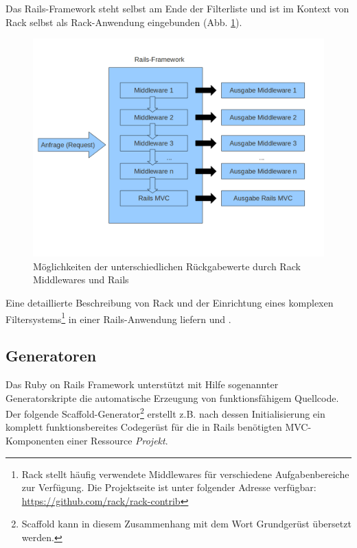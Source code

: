 %
Das Rails-Framework steht selbst am Ende der Filterliste und ist im Kontext von Rack selbst als Rack-Anwendung eingebunden (Abb. \ref{rackmiddlewares}).
\begin{figure}[!ht]
\begin{center}
\includegraphics[scale=0.5]{images/rack/middlewares.png}
\caption{Möglichkeiten der unterschiedlichen Rückgabewerte durch Rack Middlewares und Rails}
\label{rackmiddlewares}
\end{center}
\end{figure}
Eine detaillierte Beschreibung von Rack und der Einrichtung eines komplexen Filtersystems\footnote{Rack stellt häufig verwendete Middlewares für verschiedene Aufgabenbereiche zur Verfügung. Die Projektseite ist unter folgender Adresse verfügbar: \href{https://github.com/rack/rack-contrib}{https://github.com/rack/rack-contrib}} in einer Rails-Anwendung liefern \cite{rack} und \cite{railsguiderack}.

\subsection{Generatoren}
\label{sec:railsgeneratoren}
Das Ruby on Rails Framework unterstützt mit Hilfe sogenannter Generatorskripte die automatische Erzeugung von funktionsfähigem Quellcode. Der folgende Scaffold-Generator\footnote{Scaffold kann in diesem Zusammenhang mit dem Wort Grundgerüst übersetzt werden.} erstellt z.B. nach dessen Initialisierung ein komplett funktionsbereites Codegerüst für die in Rails benötigten MVC-Komponenten einer Ressource \emph{Projekt}.

